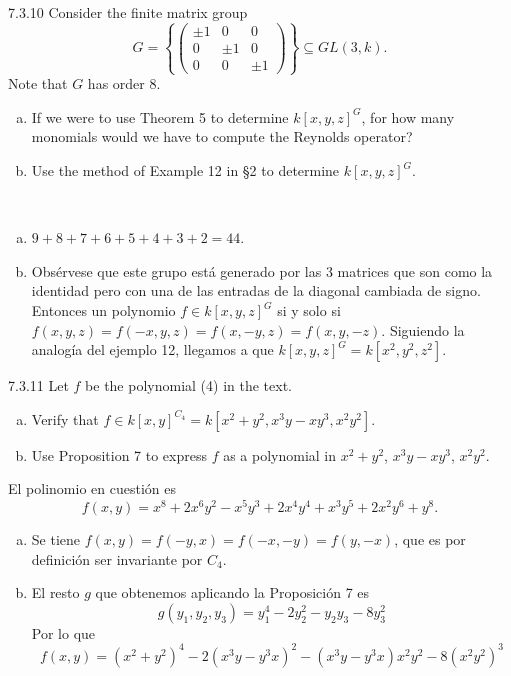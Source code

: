 \documentclass[twoside]{article}
\begin{document}
\begin{ejercicio}{7.3.10}
Consider the finite matrix group
\[
G =
\left\{\begin{pmatrix}
±1& 0 &0\\
0 &±1 &0\\
0 &0 &±1
\end{pmatrix}
\right\}
⊆ GL(3, k).
\]
Note that $G$ has order 8.
\begin{enumerate}[a.]
\item If we were to use Theorem 5 to determine $k[x, y, z]^G$, for how many monomials would
we have to compute the Reynolds operator?
\item Use the method of Example 12 in §2 to determine $k[x, y, z]^G$.
\end{enumerate}
 
\end{ejercicio}
\begin{solucion}\
\begin{enumerate}[a.]
\item $9+8+7+6+5+4+3+2=44$. 
\item Obsérvese que este grupo está generado por las 3 matrices que son como la identidad pero con una de las entradas de la diagonal cambiada de signo. Entonces un polynomio $f\in k[x, y, z]^G$ si y solo si $f(x,y,z)=f(-x,y,z)=f(x,-y,z)=f(x,y,-z)$. Siguiendo la analogía del ejemplo 12, llegamos a que $k[x, y, z]^G=k[x^2,y^2,z^2]$.
\end{enumerate}
\end{solucion}
\newpage


\begin{ejercicio}{7.3.11}
Let $f$ be the polynomial (4) in the text.
\begin{enumerate}[a.]
\item Verify that $f ∈ k[x, y]^{C_4} = k[x^2 + y^2, x^3y − xy^3, x^2y^2]$.
\item Use Proposition 7 to express $f$ as a polynomial in $x^2 + y^2$, $x^3y − xy^3$, $x^2y^2$.
\end{enumerate}
\end{ejercicio}
\begin{solucion} 
El polinomio en cuestión es $$f (x, y) = x^8 + 2x^6y^2 − x^5y^3 + 2x^4y^4 + x^3y^5 + 2x^2y^6 + y^8.$$
\begin{enumerate}[a.]
\item Se tiene $f(x,y)=f(-y,x)=f(-x,-y)=f(y,-x)$, que es por definición ser invariante por $C_4$.
\item El resto $g$ que obtenemos aplicando la Proposición 7 es
$$
g(y_1,y_2,y_3) = y_1^4 - 2y_2^2-y_2y_3 - 8y_3^2
$$ 
Por lo que 
$$
f(x,y) = (x^2+y^2)^4-2(x^3y-y^3x)^2 - (x^3y-y^3x)x^2y^2 - 8(x^2y^2)^3
$$
\end{enumerate}
\end{solucion}
\end{document}
